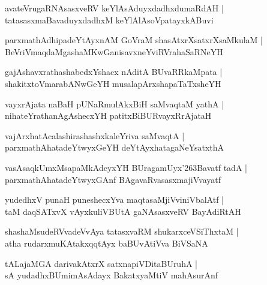 \documentclass[twoside,12pt,openright]{book}
\def\S{\char'263}
\newcounter{shloka}[chapter]
\begin{document}
\begin{shloka}%
avateVrugaRNAsasxveRV keYlAsAduyxdadhxdumaRdAH |\\
tatasasxmaBavaduyxdadhxM keYlAlAsoVpatayxkABuvi
\end{shloka}

\begin{shloka}%
parxmathAdhipadeYtAyxnAM GoVraM shasAtxrXsatxrXsaMkulaM |\\
BeVriVmaqdaMgashaMKwGanisavxneYviRVrahaSaRNeYH
\end{shloka}

\begin{shloka}%
gajAshavxrathashabedxYshacx nAditA BUvaRRkaMpata |\\
shakitxtoVmarabANwGeYH musalapArxshapaTaTxsheYH 
\end{shloka}

\begin{shloka}%
vayxrAjata naBaH pUNaRmulAkxBiH saMvaqtaM yathA |\\
nihateYrathanAgAshecxYH patitxBiBURvayxRrAjataH 
\end{shloka}

\begin{shloka}%
vajArxhatAcalashirashashxkaleYriva saMvaqtA |\\
parxmathAhatadeYtwyxGeYH deYtAyxhatagaNeYsatxthA 
\end{shloka}

\begin{shloka}%
vasAsaqkUmxMsapaMkAdeyxYH BUragamUyx\S Bavatf tadA |\\
parxmathAhatadeYtwyxGAnf BAgavaRvasasxmajiVvayatf 
\end{shloka}

\begin{shloka}%
yudedhxV punaH puneshecxYva maqtasaMjiVviniVbalAtf |\\
taM daqSATxvX vAyxkuliVBUtA gaNAsasxveRV BayAdiRtAH 
\end{shloka}

\begin{shloka}%
shashaMsudeRVvadeVvAya tatasxvaRM shukarxceVSiThxtaM |\\
atha rudarxmuKAtakxqqtAyx baBUvAtiVva BiVSaNA 
\end{shloka}

\begin{shloka}%
tALajaMGA darivakAtxrX satxnapiVDitaBUruhA |\\
sA yudadhxBUmimAsAdayx BakatxyaMtiV mahAsurAnf 
\end{shloka}
\end{document}

